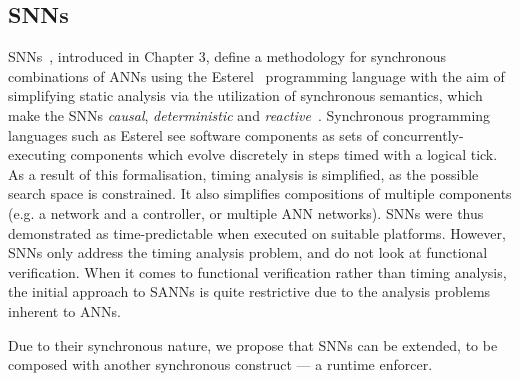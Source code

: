 \subsection{\acfp{SNN}}

\acp{SNN}~\cite{sann}, introduced in Chapter 3, define a methodology for synchronous combinations of \acp{ANN} using the Esterel~\cite{berry2000foundations} programming language with the aim of simplifying static analysis via the utilization of synchronous semantics, which make the \acp{SNN} \textit{causal}, \textit{deterministic} and \textit{reactive}~\cite{benveniste2003synchronous}. 
Synchronous programming languages such as Esterel see software components as sets of concurrently-executing components which evolve discretely in steps timed with a logical tick.
As a result of this formalisation, timing analysis is simplified, as the possible search space is constrained.
It also simplifies compositions of multiple components (e.g. a network and a controller, or multiple \ac{ANN} networks).
\acp{SNN} were thus demonstrated as time-predictable when executed on suitable platforms.
However, \acp{SNN} only address the timing analysis problem, and do not look at functional verification.
When it comes to functional verification rather than timing analysis, the initial approach to \acp{SANN} is quite restrictive due to the analysis problems inherent to \acp{ANN}. 


Due to their synchronous nature, we propose that \acp{SNN} can be extended, to be composed with another synchronous construct --- a runtime enforcer.




